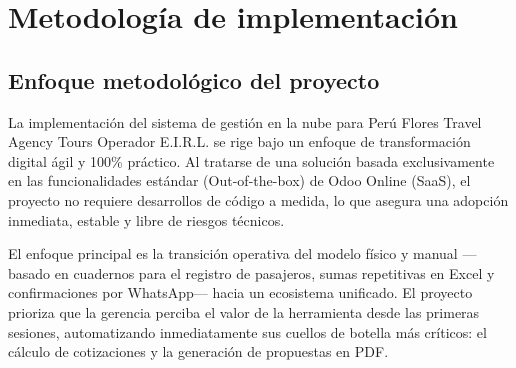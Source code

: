 \section{Metodología de implementación}

\subsection{Enfoque metodológico del proyecto}
\begin{indentedsubsection}
La implementación del sistema de gestión en la nube para Perú Flores Travel Agency Tours Operador E.I.R.L. se rige bajo un enfoque de transformación digital ágil y 100\% práctico. Al tratarse de una solución basada exclusivamente en las funcionalidades estándar (Out-of-the-box) de Odoo Online (SaaS), el proyecto no requiere desarrollos de código a medida, lo que asegura una adopción inmediata, estable y libre de riesgos técnicos.

El enfoque principal es la transición operativa del modelo físico y manual ---basado en cuadernos para el registro de pasajeros, sumas repetitivas en Excel y confirmaciones por WhatsApp--- hacia un ecosistema unificado. El proyecto prioriza que la gerencia perciba el valor de la herramienta desde las primeras sesiones, automatizando inmediatamente sus cuellos de botella más críticos: el cálculo de cotizaciones y la generación de propuestas en PDF.
\end{indentedsubsection}

